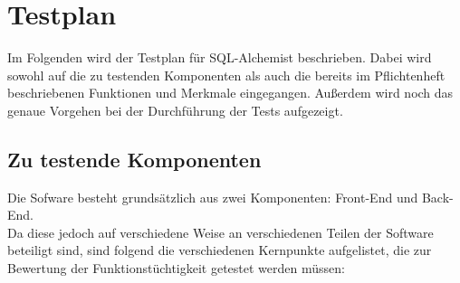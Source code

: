 
\chapter{Testplan}

Im Folgenden wird der Testplan für SQL-Alchemist beschrieben. Dabei wird sowohl auf die zu testenden Komponenten als auch die bereits im Pflichtenheft beschriebenen Funktionen und Merkmale eingegangen. Außerdem wird noch das genaue Vorgehen bei der Durchführung der Tests aufgezeigt.

\section{Zu testende Komponenten}

Die Sofware besteht grundsätzlich aus zwei Komponenten: Front-End und Back-End.\\
Da diese jedoch auf verschiedene Weise an verschiedenen Teilen der Software beteiligt sind, sind folgend die verschiedenen Kernpunkte aufgelistet, die zur Bewertung der Funktionstüchtigkeit getestet werden müssen:

